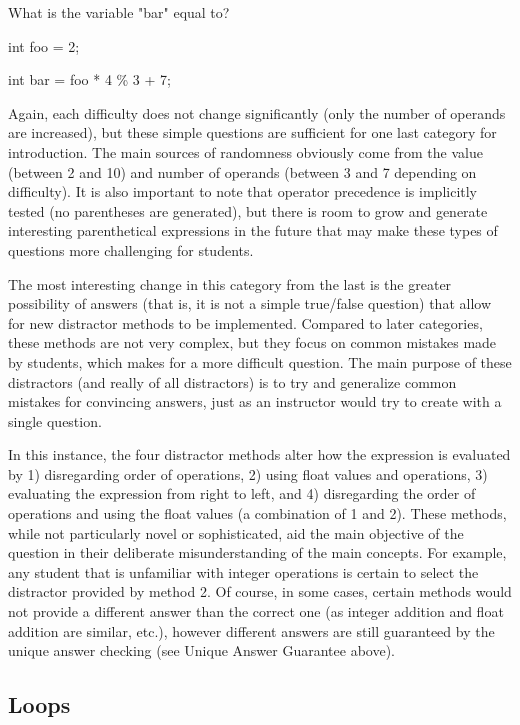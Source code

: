 \documentclass{article}
\begin{document}
\hfill \par
What is the variable "bar" equal to? \par
int foo = 2; \par
int bar = foo * 4 \% 3 + 7; \par
\hfill \par

Again, each difficulty does not change significantly (only the number of operands are increased), but these simple questions are sufficient for one last category for introduction.
The main sources of randomness obviously come from the value (between 2 and 10) and number of operands (between 3 and 7 depending on difficulty). It is also important to note that
operator precedence is implicitly tested (no parentheses are generated), but there is room to grow and generate interesting parenthetical expressions in the future that may make
these types of questions more challenging for students. 

The most interesting change in this category from the last is the greater possibility of answers (that is, it is not a simple true/false question) that allow for new distractor methods to be implemented. Compared to later categories, these methods are not very complex, but they focus on common mistakes made by students, which makes for a more difficult question. The main
purpose of these distractors (and really of all distractors) is to try and generalize common mistakes for convincing answers, just as an instructor would try to create with a single question. 

In this instance, the four distractor methods alter how the expression is evaluated by 1) disregarding order of operations, 2) using float values and operations, 3) evaluating the expression from
right to left, and 4) disregarding the order of operations and using the float values (a combination of 1 and 2). These methods, while not particularly novel or sophisticated, aid the main objective 
of the question in their deliberate misunderstanding of the main concepts. For example, any student that is unfamiliar with integer operations is certain to select the distractor provided by method 2. Of course, in some cases, certain methods would not provide a different answer than the correct one (as integer addition and float addition are similar, etc.), however different answers are still guaranteed by the unique answer checking (see Unique Answer Guarantee above).

\subsection{Loops}
\end{document}
